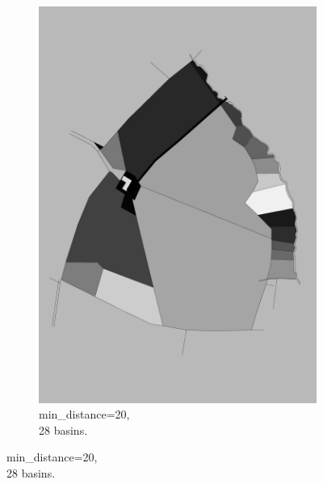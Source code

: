 \documentclass[12pt]{article}
\begin{document}
\begin{figure}[H]
\begin{subfigure}[b]{.3\textwidth}
		\includegraphics[width=1\linewidth]{images/polygon_recovery/watershed2_distance20_b28.png}  
		\caption{min\_distance=20, \\ 28 basins.}
	\end{subfigure}
	

\end{figure}
\end{document}
